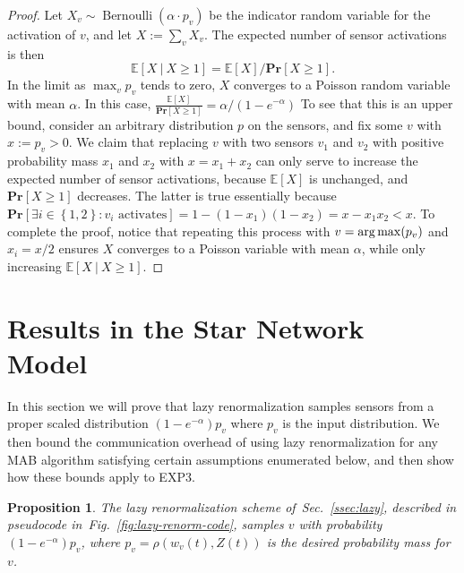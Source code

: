 \documentclass{sig-alternate-dan}
\numberwithin{equation}{section}
\newcommand{\algofont}[1]{\textsc{#1}}
\newcommand{\EXPthree}{{\algofont{EXP3}}\xspace}
\newcommand{\sensor}{\ensuremath{v}}
\newcommand{\sensors}{V}
\newcommand{\event}{\ensuremath{\mathcal{E}}}
\newcommand{\Bernoulli}[1]{\ensuremath{\operatorname{Bernoulli}({#1})}}
\newcommand{\ignore}[1]{}
\newcommand{\figref}[1]{Fig.~\ref{#1}}
\newcommand{\secref}[1]{Sec.~\ref{#1}}
\def \argmax {\mathop{\rm arg\,max}}
\newcommand{\set}[1]{\ensuremath{\left\{#1\right\}}}
\newcommand{\prob}[1]{\ensuremath{\mathbf{Pr}\left[#1\right] }}
\newcommand{\E}[1]{\ensuremath{\mathbb{E}\left[#1\right] }}
\newtheorem{prop}[theorem]{Proposition}
\begin{document}
{\begin{proof}
Let $X_{\sensor} \sim \Bernoulli{\alpha \cdot p_{\sensor}}$ be the indicator random
variable for the activation of $\sensor$, and let $X := \sum_{\sensor}
X_{\sensor}$.  The expected number of sensor activations is then
\[
\E{X \ |\ X \ge 1} = \E{X}/\prob{X \ge 1} \mbox{.}
\]
In the limit as $\max_{\sensor} p_{\sensor}$ tends to zero, $X$
converges to a Poisson random variable with mean $\alpha$.
In this case, $\frac{\E{X}}{\prob{X \ge 1}} = \alpha / (1 - e^{-\alpha})$
To see that this is an upper bound, consider an arbitrary distribution
$p$ on the sensors, and fix some $\sensor$ with $x := p_{\sensor} > 0$.
We claim that replacing $\sensor$ with two sensors $\sensor_1$ and
$\sensor_2$ with positive probability mass $x_1$ and
$x_2$ with $x = x_1+x_2$ can only serve to increase the expected number of
sensor activations, because $\E{X}$ is unchanged, and $\prob{X \ge 1}$
decreases.  The latter is true essentially because 
$\prob{\exists i \in \set{1,2}: \sensor_i \text{ activates}} = 1 -
(1-x_1)(1-x_2) = x - x_1x_2 < x$.  To complete the proof, notice that 
repeating this process with $\sensor = \argmax (p_{\sensor})$ and $x_i = x/2$ ensures $X$
converges to a Poisson variable with mean $\alpha$, while only
increasing $\E{X \ |\ X \ge 1}$.
\ignore{
easily verified by noting that conditioning
on the event $\event$ that no sensors in $\sensors \setminus
\set{\sensor, \sensor_1, \sensor_2}$ activate, $\prob{\sensor \text{ activates} | \event} = x$ and 
$\prob{\exists i \in \set{1,2}: \sensor_i \text{ activates} | \event} = 1 -
(1-x_1)(1-x_2) = x - x_1x_2 < x$.
}
\end{proof}

%
\section{Results in the Star Network\\ Model}  \label{sec:lazy-appendix}
%

%
%
%

In this section we will prove that lazy renormalization samples
sensors from a proper scaled distribution $(1 - e^{-\alpha})p_{\sensor}$ where $p_{\sensor}$ is the input distribution.
We then 
bound the communication
overhead of using lazy renormalization for any MAB algorithm
satisfying certain assumptions enumerated below, and then show how
these bounds apply to \EXPthree.


\begin{prop}
The lazy renormalization scheme of~\secref{ssec:lazy}, described in pseudocode
in~\figref{fig:lazy-renorm-code}, samples $\sensor$ with probability 
$(1 - e^{-\alpha})p_{\sensor}$,  where $p_{\sensor} =
\rho(w_{\sensor}(t), Z(t))$ is the desired probability mass for $\sensor$.
\end{prop}

}
\end{document}
